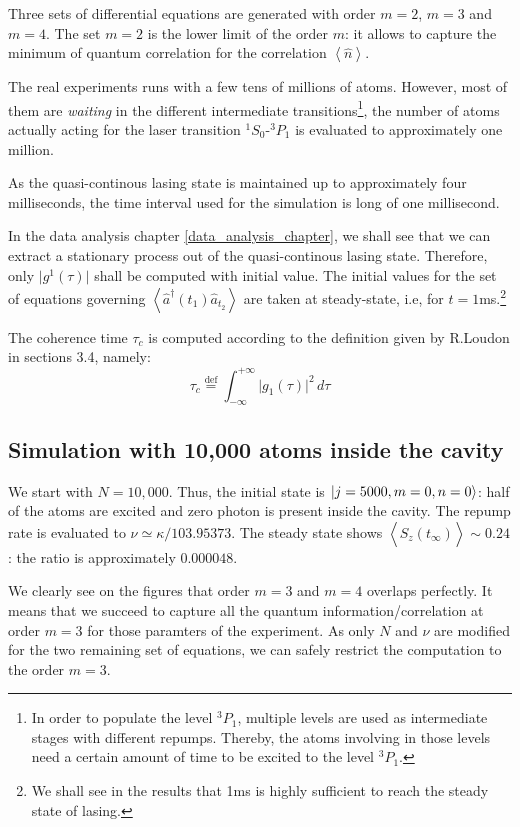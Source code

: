 \documentclass[11pt]{report}
\DeclarePairedDelimiter\ket{\lvert}{\rangle}
\begin{document}
Three sets of differential equations are generated with order $m=2$, $m=3$ and $m=4$. The set $m=2$ is the lower limit of the order $m$: it allows to capture the minimum of quantum correlation for the correlation $\left\langle \hat{n} \right\rangle$.

The real experiments runs with a few tens of millions of atoms. However, most of them are \textit{waiting} in the different intermediate transitions\footnote{In order to populate the level $^3P_1$, multiple levels are used as intermediate stages with different repumps. Thereby, the atoms involving in those levels need a certain amount of time to be excited to the level $^3P_1$.}, the number of atoms actually acting for the laser transition $^1S_0$-$^3P_1$ is evaluated to approximately one million.

As the quasi-continous lasing state is maintained up to approximately four milliseconds, the time interval used for the simulation is long of one millisecond.

In the data analysis chapter \ref{data_analysis_chapter}, we shall see that we can extract a stationary process out of the quasi-continous lasing state. Therefore, only $\vert g^1(\tau) \vert$ shall be computed with initial value. The initial values for the set of equations governing $\left\langle\hat{a}^\dagger(t_1)\hat{a}_{t_2}\right\rangle$ are taken at steady-state, i.e, for $t=1$ms.\footnote{We shall see in the results that 1ms is highly sufficient to reach the steady state of lasing.}

The coherence time $\tau_c$ is computed according to the definition given by R.Loudon in sections 3.4, namely:
\begin{equation}
\tau_c \stackrel{\text{def}}{=} \int_{-\infty}^{+\infty} \vert g_1(\tau) \vert^2 \, d\tau
\end{equation} 

\subsection{Simulation with 10,000 atoms inside the cavity}

We start with $N=10,000$. Thus, the initial state is $\ket{j=5000, m=0, n=0}$: half of the atoms are excited and zero photon is present inside the cavity. The repump rate is evaluated to $\nu \simeq \kappa / 103.95373$. The steady state shows $\left\langle \hat{S}_z(t_\infty) \right\rangle \sim 0.24$: the ratio is approximately $0.000048$.

We clearly see on the figures that order $m=3$ and $m=4$ overlaps perfectly. It means that we succeed to capture all the quantum information/correlation at order $m=3$ for those paramters of the experiment. As only $N$ and $\nu$ are modified for the two remaining set of equations, we can safely restrict the computation to the order $m=3$. 
\end{document}
